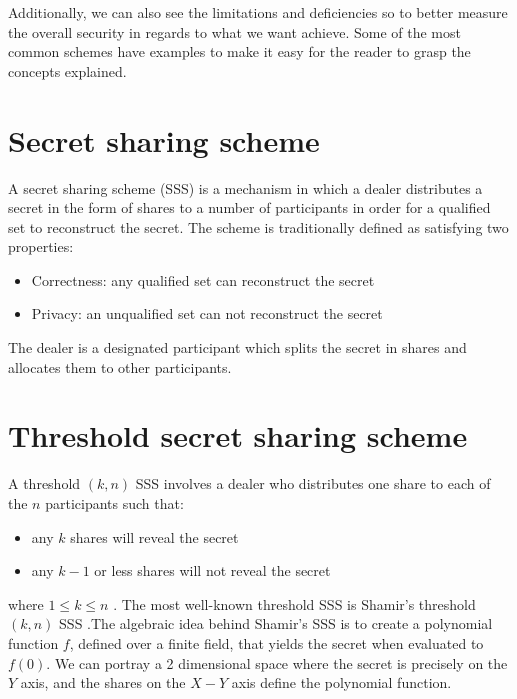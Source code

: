 \documentclass[12pt, a4paper, oneside]{book}
\begin{document}
    Additionally, we can also see the limitations and deficiencies so to better measure the overall security in regards to what we want achieve. Some of the most common schemes have examples to make it easy for the reader to grasp the concepts explained.
    \section{Secret sharing scheme}
    A secret sharing scheme (SSS) is a mechanism in which a dealer distributes a secret in the form of shares to a number of participants in order for a qualified set to reconstruct the secret. The scheme is traditionally defined as satisfying two properties:
    \begin{itemize}
    \vspace{-0.5cm}
    \item Correctness: any qualified set can reconstruct the secret
    \vspace{-0.25cm}
    \item Privacy: an unqualified set can not reconstruct the secret
    \vspace{-0.5cm}
    \end{itemize}
    The dealer is a designated participant which splits the secret in shares and allocates them to other participants.
    \section{Threshold secret sharing scheme}
    A threshold $(k,n)$ SSS involves a dealer who distributes one share to each of the $n$ participants such that:
    \begin{itemize}
    \vspace{-0.5cm}
    \item any $k$ shares will reveal the secret
    \vspace{-0.25cm}
    \item any $k{-}1$ or less shares will not reveal the secret
    \vspace{-0.5cm}
    \end{itemize}
    where $1\leq{k}\leq{n}$ \cite{ShareASecret}.
    The most well-known threshold SSS is Shamir's threshold $(k, n)$ SSS \cite{ShareASecret}.The algebraic idea behind Shamir's SSS is to create a polynomial function $f$, defined over a finite field, that yields the secret when evaluated to $f(0)$. We can portray a 2 dimensional space where the secret is precisely on the $Y$ axis, and the shares on the $X{-}Y$ axis define the polynomial function.
    
\end{document}
